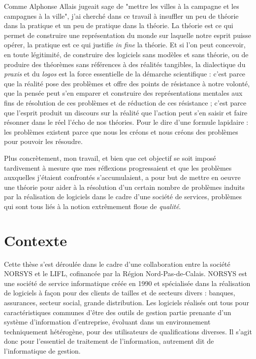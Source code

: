 
Comme Alphonse Allais jugeait sage de "mettre les villes \`a la
campagne et les campagnes \`a la ville", j'ai cherch\'e dans
ce travail \`a insuffler un peu de th\'eorie dans la pratique et un
peu de pratique dans la th\'eorie. La th\'eorie est ce qui permet de
construire une repr\'esentation du monde sur laquelle notre esprit
puisse op\'erer, la pratique est ce qui justifie \emph{in fine} la
th\'eorie. Et si l'on peut concevoir, en toute l\'egitimit\'e, de
construire des logiciels sans mod\`eles et sans th\'eorie, ou de
produire des th\'eor\`emes sans r\'ef\'erences \`a des
r\'ealit\'es tangibles, la dialectique du \emph{praxis} et du
\emph{logos} est la force essentielle de la d\'emarche scientifique :
c'est parce que la r\'ealit\'e pose des probl\`emes et offre des
points de r\'esistance \`a notre volont\'e, que la pens\'ee peut
s'en emparer et construire des repr\'esentations mentales
aux fins de r\'esolution de ces probl\`emes et de r\'eduction de
ces r\'esistance ; c'est parce que l'esprit produit un discours sur
la r\'ealit\'e que l'action peut s'en saisir et faire r\'esonner
dans le r\'eel l'\'echo de nos th\'eories. Pour le dire d'une
formule lapidaire : les probl\`emes existent parce que nous les
cr\'eons et nous cr\'eons des probl\`emes pour pouvoir les
r\'esoudre. 

Plus concr\`etement, mon travail, et bien que cet objectif se soit
impos\'e tardivement \`a mesure que mes r\'eflexions progressaient
et que les probl\`emes auxquelles j'\'etaient confront\'es
s'accumulaient, a pour but de mettre en oeuvre une th\'eorie pour
aider \`a la r\'esolution d'un certain nombre de 
probl\`emes induits par la r\'ealisation de logiciels dans le cadre
d'une soci\'et\'e de services, probl\`emes qui sont tous li\'es
\`a la notion extr\^emement floue de \emph{qualit\'e}. 

\section*{Contexte}

Cette th\`ese s'est d\'eroul\'ee dans le cadre d'une collaboration
entre la soci\'et\'e NORSYS et le LIFL, cofinanc\'ee par la
R\'egion Nord-Pas-de-Calais. NORSYS est une soci\'et\'e de service
informatique cr\'e\'ee en 1990 et sp\'ecialis\'ee dans la
r\'ealisation de logiciels \`a fa\c{c}on pour des clients de tailles
et de secteurs divers : banques, assurances, secteur social, grande
distribution. Les logiciels r\'ealis\'es ont tous pour
caract\'eristiques communes d'\^etre des outils de gestion partie
prenante d'un syst\`eme d'information d'entreprise, \'evoluant dans
un environnement techniquement h\'et\'erog\`ene, pour des
utilisateurs de qualifications diverses. Il s'agit donc pour
l'essentiel de traitement de l'information, autrement dit de
l'informatique de gestion. 

